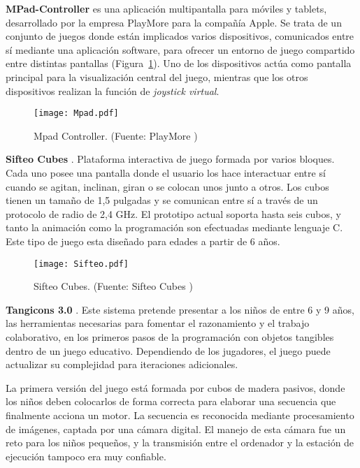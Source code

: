 \textbf{MPad-Controller} es una aplicación multipantalla para móviles y tablets, desarrollado por la empresa PlayMore para la compañía Apple. Se trata de un conjunto de juegos donde están implicados varios dispositivos, comunicados entre sí mediante una aplicación software, para ofrecer un entorno de juego compartido entre distintas pantallas (Figura~\ref{fig:Mpad}). Uno de los dispositivos actúa como pantalla principal para la visualización central del juego, mientras que los otros dispositivos realizan la función de \emph{joystick virtual}.

\begin{figure}[!h]
\begin{center}
\texttt{[image: Mpad.pdf]}
\caption{Mpad Controller. (Fuente: PlayMore \cite{Mpad})}
\label{fig:Mpad}
\end{center}
\end{figure}


\textbf{Sifteo Cubes} \cite{Merrill}. Plataforma interactiva de juego formada por varios bloques. Cada uno posee una pantalla donde el usuario los hace interactuar entre sí cuando se agitan, inclinan, giran o se colocan unos junto a otros. Los cubos tienen un tamaño de 1,5 pulgadas y se comunican entre sí a través de un protocolo de radio de 2,4 GHz. El prototipo actual soporta hasta seis cubos, y tanto la animación como la programación son efectuadas mediante lenguaje C.
Este tipo de juego esta diseñado para edades a partir de 6 años.

\begin{figure}[!h]
\begin{center}
\texttt{[image: Sifteo.pdf]}
\caption{Sifteo Cubes. (Fuente: Sifteo Cubes \cite{Merrill})}
\label{fig:Sifteo}
\end{center}
\end{figure}

\textbf{Tangicons 3.0} \cite{Tangicons}. Este sistema pretende presentar a los niños de entre 6 y 9 años, las herramientas necesarias para fomentar el razonamiento y el trabajo colaborativo, en los primeros pasos de la programación con objetos tangibles dentro de un juego educativo. Dependiendo de los jugadores, el juego puede actualizar su complejidad para iteraciones adicionales.

La primera versión del juego está formada por cubos de madera pasivos, donde los niños deben colocarlos de forma correcta para elaborar una secuencia que finalmente acciona un motor. La secuencia es reconocida mediante procesamiento de imágenes, captada por una cámara digital. El manejo de esta cámara fue un reto para los niños pequeños, y la transmisión entre el ordenador y la estación de ejecución tampoco era muy confiable.

